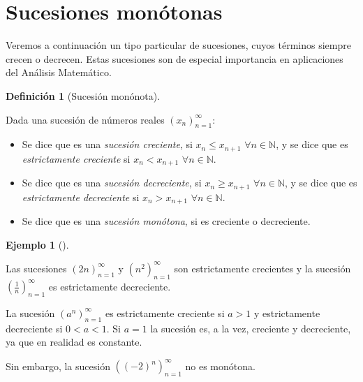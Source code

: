 \documentclass[
  a4paper,
]{scrreport}
\providecommand{\tightlist}{%
  \setlength{\itemsep}{0pt}\setlength{\parskip}{0pt}}\usepackage{longtable,booktabs,array}
\theoremstyle{definition}
\newtheorem{example}{Ejemplo}[chapter]
\theoremstyle{plain}
\theoremstyle{definition}
\newtheorem{definition}{Definición}[chapter]
\theoremstyle{plain}
\theoremstyle{plain}
\theoremstyle{remark}
\begin{document}
\hypertarget{sucesiones-monuxf3tonas}{%
\section{Sucesiones monótonas}\label{sucesiones-monuxf3tonas}}

Veremos a continuación un tipo particular de sucesiones, cuyos términos
siempre crecen o decrecen. Estas sucesiones son de especial importancia
en aplicaciones del Análisis Matemático.

\leavevmode{}%
\begin{definition}[Sucesión monónota]\label{def-sucesion-monotona}

Dada una sucesión de números reales \((x_n)_{n=1}^\infty\):

\begin{itemize}
\tightlist
\item
  Se dice que es una \emph{sucesión creciente}, si \(x_n\leq x_{n+1}\)
  \(\forall n\in\mathbb{N}\), y se dice que es \emph{estrictamente
  creciente} si \(x_n< x_{n+1}\) \(\forall n\in\mathbb{N}\).
\item
  Se dice que es una \emph{sucesión decreciente}, si \(x_n\geq x_{n+1}\)
  \(\forall n\in\mathbb{N}\), y se dice que es \emph{estrictamente
  decreciente} si \(x_n>x_{n+1}\) \(\forall n\in\mathbb{N}\).
\item
  Se dice que es una \emph{sucesión monótona}, si es creciente o
  decreciente.
\end{itemize}

\end{definition}

\leavevmode{}%
\begin{example}[]\label{exm-sucesiones-monotonas}

Las sucesiones \((2n)_{n=1}^\infty\) y \((n^2)_{n=1}^\infty\) son
estrictamente crecientes y la sucesión
\(\left(\frac{1}{n}\right)_{n=1}^\infty\) es estrictamente decreciente.

La sucesión \((a^n)_{n=1}^\infty\) es estrictamente creciente si \(a>1\)
y estrictamente decreciente si \(0<a<1\). Si \(a=1\) la sucesión es, a
la vez, creciente y decreciente, ya que en realidad es constante.

Sin embargo, la sucesión \(((-2)^n)_{n=1}^\infty\) no es monótona.

\end{example}
\end{document}
